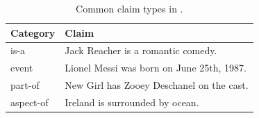 \begin{table}[t]
  \setlength{\tabcolsep}{.25em}
  \footnotesize
  \centering

  \begin{tabular}{ l l }
    \toprule
    \textbf{Category} & \textbf{Claim} \\
    \midrule
    is-a  & Jack Reacher is a romantic comedy.      \\
    event  & Lionel Messi was born on June 25th, 1987. \\
    part-of & New Girl has Zooey Deschanel on the cast.      \\
    aspect-of & Ireland is surrounded by ocean. \\
    \bottomrule
  \end{tabular}

  \caption{Common claim types in \fever.}
  \label{tbl:fever_claim_types}
\end{table}